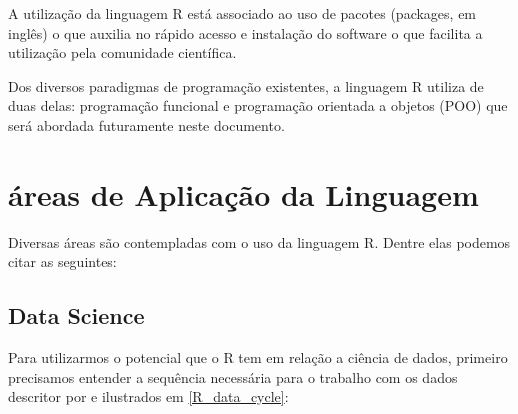     A utilização da linguagem R está associado ao uso de pacotes (packages, em inglês) o que auxilia no rápido acesso e instalação do software o que facilita a utilização pela comunidade científica.\cite{Chambers2014}

    Dos diversos paradigmas de programação existentes, a linguagem R utiliza de duas delas: programação funcional e programação orientada a objetos (POO) que será abordada futuramente neste documento.\cite{Chambers2014}


  \section{áreas de Aplicação da Linguagem}
    Diversas áreas são contempladas com o uso da linguagem R. Dentre elas podemos citar as seguintes:

    \subsection{ Data Science}
      Para utilizarmos o potencial que o R tem em relação a ciência de dados, primeiro precisamos entender a sequência necessária para o trabalho com os dados descritor por \cite{HadleyWickham2017} e ilustrados em \ref{R_data_cycle}:

